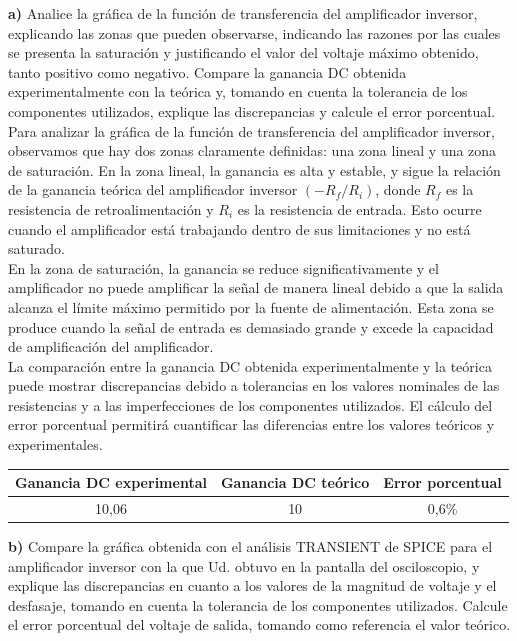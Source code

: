 \documentclass[12pt]{article}
\begin{document}
	\noindent \textbf{a)} Analice la gráfica de la función de transferencia del amplificador inversor, explicando las zonas que pueden observarse, indicando las razones por las cuales se presenta la saturación y justificando el valor del voltaje máximo obtenido, tanto positivo como	negativo. Compare la ganancia DC obtenida experimentalmente con la teórica y, tomando en cuenta la tolerancia de los componentes utilizados, explique las discrepancias y calcule el error porcentual.\\
	
	Para analizar la gráfica de la función de transferencia del amplificador inversor, observamos que hay dos zonas claramente definidas: una zona lineal y una zona de saturación. En la zona lineal, la ganancia es alta y estable, y sigue la relación de la ganancia teórica del amplificador inversor $(-R_{f}/R_{i})$, donde $R_{f}$ es la resistencia de retroalimentación y $R_{i}$ es la resistencia de entrada. Esto ocurre cuando el amplificador está trabajando dentro de sus limitaciones y no está saturado.\\
	
	En la zona de saturación, la ganancia se reduce significativamente y el amplificador no puede amplificar la señal de manera lineal debido a que la salida alcanza el límite máximo permitido por la fuente de alimentación. Esta zona se produce cuando la señal de entrada es demasiado grande y excede la capacidad de amplificación del amplificador.\\
	
	La comparación entre la ganancia DC obtenida experimentalmente y la teórica puede mostrar discrepancias debido a tolerancias en los valores nominales de las resistencias y a las imperfecciones de los componentes utilizados. El cálculo del error porcentual permitirá cuantificar las diferencias entre los valores teóricos y experimentales.\\
	
	\begin{center}
		\begin{tabular}{|c|c|c|}
			\hline
			Ganancia DC experimental & Ganancia DC teórico & Error porcentual \\
			\hline
			10,06 & 10 & 0,6\% \\
			\hline
		\end{tabular}
	\end{center}
	
	\noindent \textbf{b)} Compare la gráfica obtenida con el análisis TRANSIENT de SPICE para el amplificador inversor con la que Ud. obtuvo en la pantalla del osciloscopio, y explique las discrepancias en cuanto a los valores de la magnitud de voltaje y el desfasaje,	tomando en cuenta la tolerancia de los componentes utilizados. Calcule el error porcentual del voltaje de salida, tomando como referencia el valor teórico.\\
	
\end{document}
